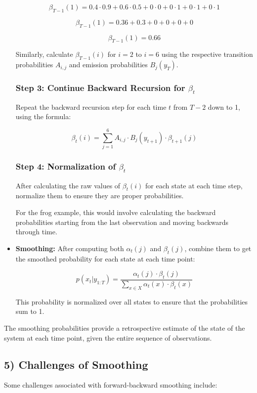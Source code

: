 \documentclass[10pt]{article}
\begin{document}
\begin{itemize}
\[ \beta_{T-1}(1) = 0.4 \cdot 0.9 + 0.6 \cdot 0.5 + 0 \cdot 0 + 0 \cdot 1 + 0 \cdot 1 + 0 \cdot 1 \]

\[ \beta_{T-1}(1) = 0.36 + 0.3 + 0 + 0 + 0 + 0 \]

\[ \beta_{T-1}(1) = 0.66 \]

Similarly, calculate \( \beta_{T-1}(i) \) for \( i = 2 \) to \( i = 6 \) using the respective transition probabilities \( A_{i,j} \) and emission probabilities \( B_j(y_T) \).

\subsubsection*{Step 3: Continue Backward Recursion for \( \beta_{t} \)}
Repeat the backward recursion step for each time \( t \) from \( T-2 \) down to 1, using the formula:

\[ \beta_{t}(i) = \sum_{j=1}^{6} A_{i,j} \cdot B_j(y_{t+1}) \cdot \beta_{t+1}(j) \]

\subsubsection*{Step 4: Normalization of \( \beta_t \)}
After calculating the raw values of \( \beta_t(i) \) for each state at each time step, normalize them to ensure they are proper probabilities.

For the frog example, this would involve calculating the backward probabilities starting from the last observation and moving backwards through time.
  \item \textbf{Smoothing:} After computing both \( \alpha_t(j) \) and \( \beta_t(j) \), combine them to get the smoothed probability for each state at each time point:

\[ p(x_t | y_{1:T}) = \frac{\alpha_t(j) \cdot \beta_t(j)}{\sum_{x \in X} \alpha_t(x) \cdot \beta_t(x)} \]

This probability is normalized over all states to ensure that the probabilities sum to 1.
\end{itemize}

The smoothing probabilities provide a retrospective estimate of the state of the system at each time point, given the entire sequence of observations.

\subsection*{5) Challenges of Smoothing}
Some challenges associated with forward-backward smoothing include:
\end{document}
